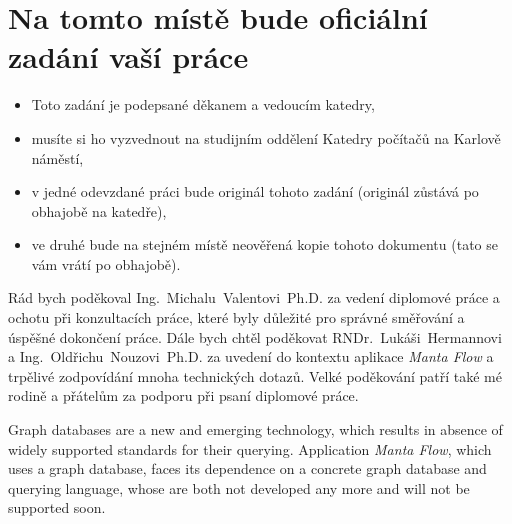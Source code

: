 \documentclass[11pt,twoside,a4paper]{book}
\begin{document}
	\translate				%

	{
	 \cleardoublepage \thispagestyle{empty}
	\chapter*{Na tomto místě bude oficiální zadání vaší práce}
	\begin{itemize}
		\item Toto zadání je podepsané děkanem a vedoucím katedry,
		\item musíte si ho vyzvednout na studijním oddělení Katedry počítačů na Karlově náměstí,
		\item v jedné odevzdané práci bude originál tohoto zadání (originál zůstává po obhajobě na katedře),
		\item ve druhé bude na stejném místě neověřená kopie tohoto dokumentu (tato se vám vrátí po obhajobě).
	\end{itemize}
	\newpage
	}

	\coverpagestarts


	\acknowledgements
	\noindent
   Rád bych poděkoval Ing.~Michalu~Valentovi~Ph.D. za vedení diplomové práce a ochotu při konzultacích
   práce, které byly důležité pro správné směřování a úspěšné dokončení práce. Dále bych chtěl poděkovat
   RNDr.~Lukáši~Hermannovi a Ing.~Oldřichu~Nouzovi~Ph.D. za uvedení do kontextu aplikace \textit{Manta Flow} a trpělivé
   zodpovídání mnoha technických dotazů. Velké poděkování patří také mé rodině a přátelům
   za podporu při psaní diplomové práce.




	\abstractpage

   Graph databases are a new and emerging technology, which results in absence of widely supported standards for their querying. Application \textit{Manta Flow}, which uses a graph database, faces its dependence on a concrete graph database and querying language, whose are both not developed any more and will not be supported soon.
\end{document}
